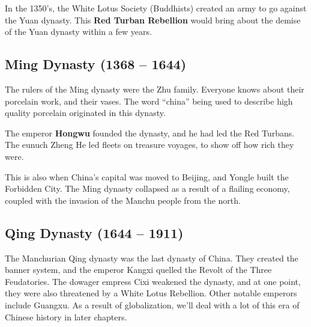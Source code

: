 In the 1350's, the White Lotus Society (Buddhists) created an army to go against the Yuan dynasty.
This \textbf{Red Turban Rebellion} would bring about the demise of the Yuan dynasty within a few years.

\subsection*{Ming Dynasty (1368 -- 1644)}

The rulers of the Ming dynasty were the Zhu family.
Everyone knows about their porcelain work, and their vases.
The word ``china'' being used to describe high quality porcelain originated in this dynasty.

The emperor \textbf{Hongwu} founded the dynasty, and he had led the Red Turbans.
The eunuch Zheng He led fleets on treasure voyages, to show off how rich they were.

This is also when China's capital was moved to Beijing, and Yongle built the Forbidden City.
The Ming dynasty collapsed as a result of a flailing economy,
coupled with the invasion of the Manchu people from the north.

\subsection*{Qing Dynasty (1644 -- 1911)}

The Manchurian Qing dynasty was the last dynasty of China.
They created the banner system, and the emperor Kangxi quelled the Revolt of the Three Feudatories.
The dowager empress Cixi weakened the dynasty, and at one point,
they were also threatened by a White Lotus Rebellion.
Other notable emperors include Guangxu.
As a result of globalization, we'll deal with a lot of this era of Chinese history in later chapters.
